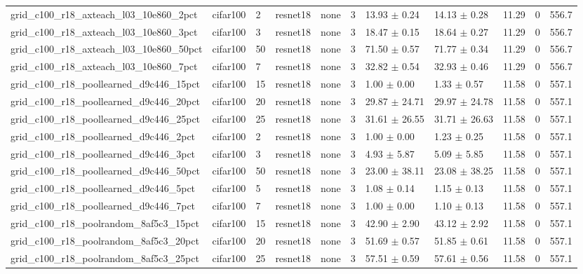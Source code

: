 \begin{tabular}{lllllllllll}
grid_c100_r18_axteach_l03_10e860_2pct & cifar100 & 2 & resnet18 & none & 3 & 13.93 $\pm$ 0.24 & 14.13 $\pm$ 0.28 & 11.29 & 0 & 556.7 \\
grid_c100_r18_axteach_l03_10e860_3pct & cifar100 & 3 & resnet18 & none & 3 & 18.47 $\pm$ 0.15 & 18.64 $\pm$ 0.27 & 11.29 & 0 & 556.7 \\
grid_c100_r18_axteach_l03_10e860_50pct & cifar100 & 50 & resnet18 & none & 3 & 71.50 $\pm$ 0.57 & 71.77 $\pm$ 0.34 & 11.29 & 0 & 556.7 \\
grid_c100_r18_axteach_l03_10e860_7pct & cifar100 & 7 & resnet18 & none & 3 & 32.82 $\pm$ 0.54 & 32.93 $\pm$ 0.46 & 11.29 & 0 & 556.7 \\
grid_c100_r18_poollearned_d9c446_15pct & cifar100 & 15 & resnet18 & none & 3 & 1.00 $\pm$ 0.00 & 1.33 $\pm$ 0.57 & 11.58 & 0 & 557.1 \\
grid_c100_r18_poollearned_d9c446_20pct & cifar100 & 20 & resnet18 & none & 3 & 29.87 $\pm$ 24.71 & 29.97 $\pm$ 24.78 & 11.58 & 0 & 557.1 \\
grid_c100_r18_poollearned_d9c446_25pct & cifar100 & 25 & resnet18 & none & 3 & 31.61 $\pm$ 26.55 & 31.71 $\pm$ 26.63 & 11.58 & 0 & 557.1 \\
grid_c100_r18_poollearned_d9c446_2pct & cifar100 & 2 & resnet18 & none & 3 & 1.00 $\pm$ 0.00 & 1.23 $\pm$ 0.25 & 11.58 & 0 & 557.1 \\
grid_c100_r18_poollearned_d9c446_3pct & cifar100 & 3 & resnet18 & none & 3 & 4.93 $\pm$ 5.87 & 5.09 $\pm$ 5.85 & 11.58 & 0 & 557.1 \\
grid_c100_r18_poollearned_d9c446_50pct & cifar100 & 50 & resnet18 & none & 3 & 23.00 $\pm$ 38.11 & 23.08 $\pm$ 38.25 & 11.58 & 0 & 557.1 \\
grid_c100_r18_poollearned_d9c446_5pct & cifar100 & 5 & resnet18 & none & 3 & 1.08 $\pm$ 0.14 & 1.15 $\pm$ 0.13 & 11.58 & 0 & 557.1 \\
grid_c100_r18_poollearned_d9c446_7pct & cifar100 & 7 & resnet18 & none & 3 & 1.00 $\pm$ 0.00 & 1.10 $\pm$ 0.13 & 11.58 & 0 & 557.1 \\
grid_c100_r18_poolrandom_8af5c3_15pct & cifar100 & 15 & resnet18 & none & 3 & 42.90 $\pm$ 2.90 & 43.12 $\pm$ 2.92 & 11.58 & 0 & 557.1 \\
grid_c100_r18_poolrandom_8af5c3_20pct & cifar100 & 20 & resnet18 & none & 3 & 51.69 $\pm$ 0.57 & 51.85 $\pm$ 0.61 & 11.58 & 0 & 557.1 \\
grid_c100_r18_poolrandom_8af5c3_25pct & cifar100 & 25 & resnet18 & none & 3 & 57.51 $\pm$ 0.59 & 57.61 $\pm$ 0.56 & 11.58 & 0 & 557.1 \\

\end{tabular}
